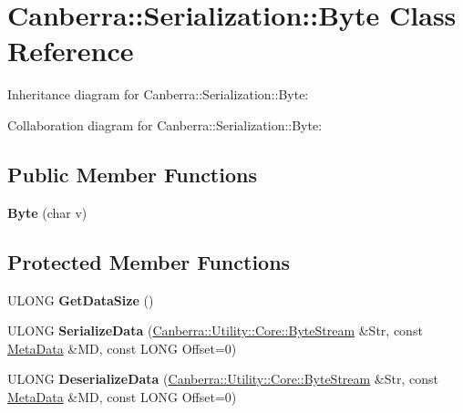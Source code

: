\hypertarget{class_canberra_1_1_serialization_1_1_byte}{}\section{Canberra\+:\+:Serialization\+:\+:Byte Class Reference}
\label{class_canberra_1_1_serialization_1_1_byte}


Inheritance diagram for Canberra\+:\+:Serialization\+:\+:Byte\+:


Collaboration diagram for Canberra\+:\+:Serialization\+:\+:Byte\+:
\subsection*{Public Member Functions}
\begin{DoxyCompactItemize}
\item 
\mbox{\label{class_canberra_1_1_serialization_1_1_byte_a362c09ea64998ea7b0aac361daaa58b3}} 
{\bfseries Byte} (char v)
\end{DoxyCompactItemize}
\subsection*{Protected Member Functions}
\begin{DoxyCompactItemize}
\item 
\mbox{\label{class_canberra_1_1_serialization_1_1_byte_aa9036fe420be8f2a3fd1ab6f2312f600}} 
U\+L\+O\+NG {\bfseries Get\+Data\+Size} ()
\item 
\mbox{\label{class_canberra_1_1_serialization_1_1_byte_a98724f1bd6da71142075e97fe179fd70}} 
U\+L\+O\+NG {\bfseries Serialize\+Data} (\hyperlink{class_canberra_1_1_utility_1_1_core_1_1_byte_stream}{Canberra\+::\+Utility\+::\+Core\+::\+Byte\+Stream} \&Str, const \hyperlink{class_canberra_1_1_serialization_1_1_meta_data}{Meta\+Data} \&MD, const L\+O\+NG Offset=0)
\item 
\mbox{\label{class_canberra_1_1_serialization_1_1_byte_a261cf955b36d5f982ce3d89d0adabc9e}} 
U\+L\+O\+NG {\bfseries Deserialize\+Data} (\hyperlink{class_canberra_1_1_utility_1_1_core_1_1_byte_stream}{Canberra\+::\+Utility\+::\+Core\+::\+Byte\+Stream} \&Str, const \hyperlink{class_canberra_1_1_serialization_1_1_meta_data}{Meta\+Data} \&MD, const L\+O\+NG Offset=0)
\end{DoxyCompactItemize}

